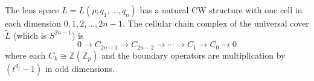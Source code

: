 The lens space $L = L(p; q_1, \ldots, q_n)$ has a natural CW structure with one cell in each dimension $0, 1, 2, \ldots, 2n-1$. The cellular chain complex of the universal cover $\tilde{L}$ (which is $S^{2n-1}$) is
$$0 \rightarrow C_{2n-1} \rightarrow C_{2n-2} \rightarrow \cdots \rightarrow C_1 \rightarrow C_0 \rightarrow 0$$
where each $C_k \cong \mathbb{Z}(\mathbb{Z}_p)$ and the boundary operators are multiplication by $(t^{q_j} - 1)$ in odd dimensions.
